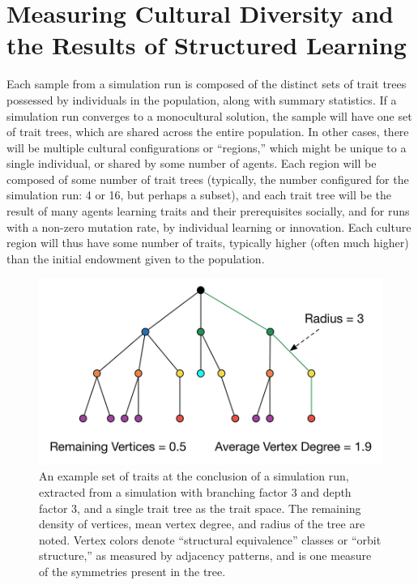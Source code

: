 \documentclass[referee,graybox,natbib]{svmult}
\begin{document}
\section{Measuring Cultural Diversity and the Results of Structured
Learning}\label{measuring-cultural-diversity-and-the-results-of-structured-learning}

Each sample from a simulation run is composed of the distinct sets of
trait trees possessed by individuals in the population, along with
summary statistics. If a simulation run converges to a monocultural
solution, the sample will have one set of trait trees, which are shared
across the entire population. In other cases, there will be multiple
cultural configurations or ``regions,'' which might be unique to a
single individual, or shared by some number of agents. Each region will
be composed of some number of trait trees (typically, the number
configured for the simulation run: 4 or 16, but perhaps a subset), and
each trait tree will be the result of many agents learning traits and
their prerequisites socially, and for runs with a non-zero mutation
rate, by individual learning or innovation. Each culture region will
thus have some number of traits, typically higher (often much higher)
than the initial endowment given to the population.

\begin{figure}[htbp] 
\centering 
\includegraphics[]{equil-trait-tree.png} 
\caption{An example set of traits at the conclusion of a simulation run, extracted from a simulation with branching factor 3 and depth factor 3, and a single trait tree as the trait space.  The remaining density of vertices, mean vertex degree, and radius of the tree are noted.  Vertex colors denote ``structural equivalence'' classes or ``orbit structure,'' as measured by adjacency patterns, and is one measure of the symmetries present in the tree.} 
\label{img:final-tree} 
\end{figure}
\end{document}
